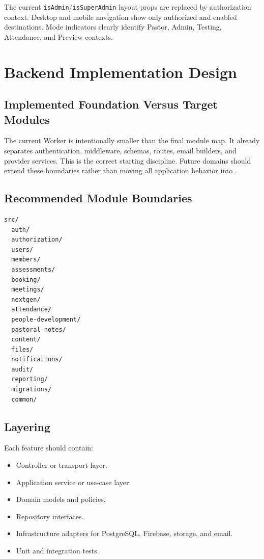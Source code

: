 \documentclass[11pt,a4paper,oneside]{report}
\begin{document}
The current \texttt{isAdmin}/\texttt{isSuperAdmin} layout props are replaced by authorization context. Desktop and mobile navigation show only authorized and enabled destinations. Mode indicators clearly identify Pastor, Admin, Testing, Attendance, and Preview contexts.

\chapter{Backend Implementation Design}

\section{Implemented Foundation Versus Target Modules}

The current Worker is intentionally smaller than the final module map. It already separates authentication, middleware, schemas, routes, email builders, and provider services. This is the correct starting discipline. Future domains should extend these boundaries rather than moving all application behavior into .

\section{Recommended Module Boundaries}

\begin{lstlisting}[caption={Recommended backend modules}]
src/
  auth/
  authorization/
  users/
  members/
  assessments/
  booking/
  meetings/
  nextgen/
  attendance/
  people-development/
  pastoral-notes/
  content/
  files/
  notifications/
  audit/
  reporting/
  migrations/
  common/
\end{lstlisting}

\section{Layering}

Each feature should contain:

\begin{itemize}
  \item Controller or transport layer.
  \item Application service or use-case layer.
  \item Domain models and policies.
  \item Repository interfaces.
  \item Infrastructure adapters for PostgreSQL, Firebase, storage, and email.
  \item Unit and integration tests.
\end{itemize}
\end{document}
